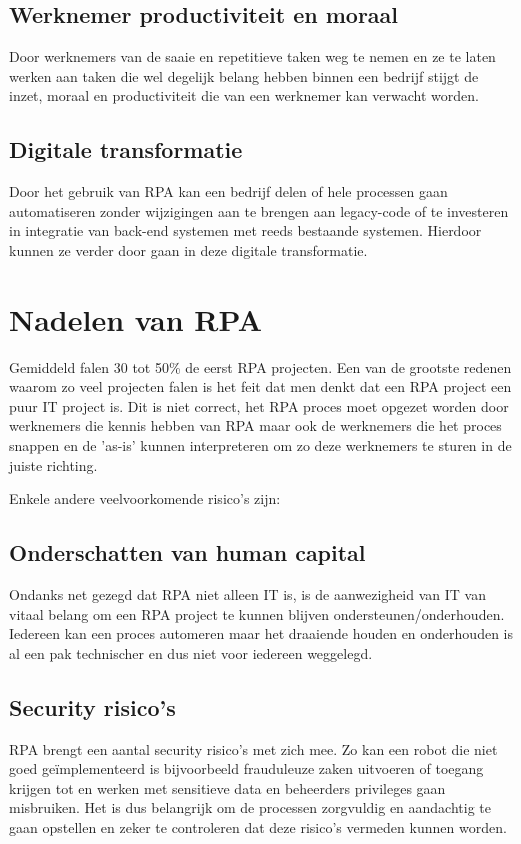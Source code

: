 \subsection{Werknemer productiviteit en moraal}
Door werknemers van de saaie en repetitieve taken weg te nemen en ze te laten werken aan taken die wel degelijk belang hebben binnen een bedrijf stijgt de inzet, moraal en productiviteit die van een werknemer kan verwacht worden. \autocite{efficiencyRPA}

\subsection{Digitale transformatie}
Door het gebruik van RPA kan een bedrijf delen of hele processen gaan automatiseren zonder wijzigingen aan te brengen aan legacy-code of te investeren in integratie van back-end systemen met reeds bestaande systemen. Hierdoor kunnen ze verder door gaan in deze digitale transformatie. \autocite{efficiencyRPA}

\section{Nadelen van RPA}
Gemiddeld falen 30 tot 50\% de eerst RPA projecten. \autocite{everythingRPA} Een van de grootste redenen waarom zo veel projecten falen is het feit dat men denkt dat een RPA project een puur IT project is. Dit is niet correct, het RPA proces moet opgezet worden door werknemers die kennis hebben van RPA maar ook de werknemers die het proces snappen en de 'as-is' kunnen interpreteren om zo deze werknemers te sturen in de juiste richting.

Enkele andere veelvoorkomende risico's zijn:

\subsection{Onderschatten van human capital}
Ondanks net gezegd dat RPA niet alleen IT is, is de aanwezigheid van IT van vitaal belang om een RPA project te kunnen blijven ondersteunen/onderhouden. Iedereen kan een proces automeren maar het draaiende houden en onderhouden is al een pak technischer en dus niet voor iedereen weggelegd. \autocite{everythingRPA}

\subsection{Security risico's}
RPA brengt een aantal security risico's met zich mee. Zo kan een robot die niet goed geïmplementeerd is bijvoorbeeld frauduleuze zaken uitvoeren of toegang krijgen tot en werken met sensitieve data en beheerders privileges gaan misbruiken. Het is dus belangrijk om de processen zorgvuldig en aandachtig te gaan opstellen en zeker te controleren dat deze risico's vermeden kunnen worden. \autocite{everythingRPA} \autocite{predictionRPA}

